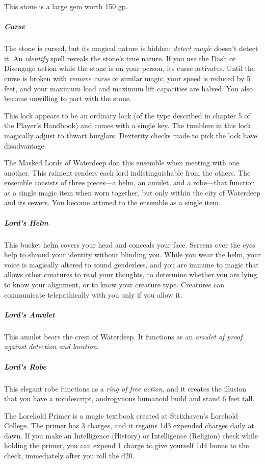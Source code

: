 \documentclass[10pt,a4paper,twoside,bg=print,twocolumn,openany,nodeprecatedcode]{dndbook}
\begin{document}
This stone is a large gem worth 150 gp.

\subparagraph{Curse}
The stone is cursed, but its magical nature is hidden; \textit{detect magic} doesn't detect it. An \textit{identify} spell reveals the stone's true nature. If you use the Dash or Disengage action while the stone is on your person, its curse activates. Until the curse is broken with \textit{remove curse} or similar magic, your speed is reduced by 5 feet, and your maximum load and maximum lift capacities are halved. You also become unwilling to part with the stone.

This lock appears to be an ordinary lock (of the type described in chapter 5 of the Player's Handbook) and comes with a single key. The tumblers in this lock magically adjust to thwart burglars. Dexterity checks made to pick the lock have disadvantage.

The Masked Lords of Waterdeep don this ensemble when meeting with one another. This raiment renders each lord indistinguishable from the others. The ensemble consists of three pieces—a helm, an amulet, and a robe—that function as a single magic item when worn together, but only within the city of Waterdeep and its sewers. You become attuned to the ensemble as a single item.

\subparagraph{Lord's Helm}
This bucket helm covers your head and conceals your face. Screens over the eyes help to shroud your identity without blinding you. While you wear the helm, your voice is magically altered to sound genderless, and you are immune to magic that allows other creatures to read your thoughts, to determine whether you are lying, to know your alignment, or to know your creature type. Creatures can communicate telepathically with you only if you allow it.

\subparagraph{Lord's Amulet}
This amulet bears the crest of Waterdeep. It functions as an \textit{amulet of proof against detection and location}.

\subparagraph{Lord's Robe}
This elegant robe functions as a \textit{ring of free action}, and it creates the illusion that you have a nondescript, androgynous humanoid build and stand 6 feet tall.

The Lorehold Primer is a magic textbook created at Strixhaven's Lorehold College. The primer has 3 charges, and it regains 1d3 expended charges daily at dawn. If you make an Intelligence (History) or Intelligence (Religion) check while holding the primer, you can expend 1 charge to give yourself 1d4 bonus to the check, immediately after you roll the d20.
\end{document}
